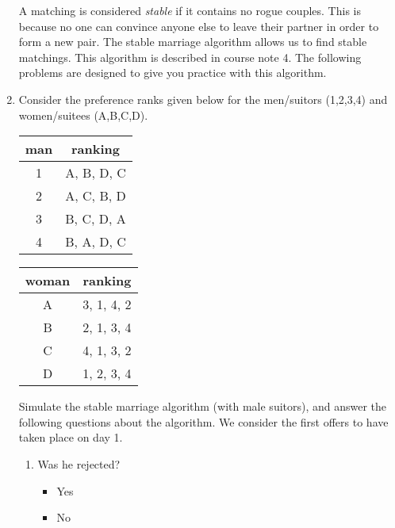 \documentclass[11pt, preview]{standalone} %
\begin{document}
\begin{enumerate}
\begin{Multi}
\begin{enumerate}
\end{enumerate}
\end{Multi}
 A matching is considered \emph{stable} if it contains no rogue couples. This is because no one can convince anyone else to leave their partner in order to form a new pair. The stable marriage algorithm allows us to find stable matchings. This algorithm is described in course note 4. The following problems are designed to give you practice with this algorithm.
\item Consider the preference ranks given below for the men/suitors (1,2,3,4) and women/suitees (A,B,C,D). 
\begin{center}
\begin{tabular}{|c|c|}
\hline
man & ranking \\
\hline
1 & A, B, D, C \\
\hline
2 & A, C, B, D\\
\hline
3 & B, C, D, A\\
\hline
4 & B, A, D, C\\
\hline
\end{tabular}
\qquad
\begin{tabular}{|c|c|}
\hline
woman & ranking \\
\hline
A & 3, 1, 4, 2\\
\hline
B &  2, 1, 3, 4\\
\hline
C & 4, 1, 3, 2\\
\hline
D & 1, 2, 3, 4\\
\hline
\end{tabular}
\end{center}
Simulate the stable marriage algorithm (with male suitors), and answer the following questions about the algorithm. We consider the first offers to have taken place on day 1.
\begin{enumerate}
\item Was he rejected? %
\begin{Choices}
\begin{itemize}
\FalseChoice \item Yes
\TrueChoice \item No

\end{itemize}
\end{Choices}
\end{enumerate}
\end{enumerate}
\end{document}
